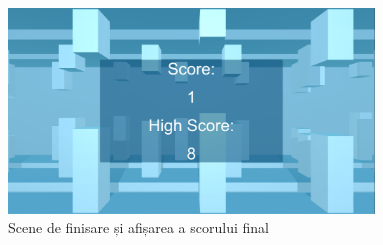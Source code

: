 \begin{figure}[ht]
	\centering
	\includegraphics[width=9.7cm]{end}
	\caption{Scene de finisare și afișarea a scorului final}
\end{figure}

\clearpage
